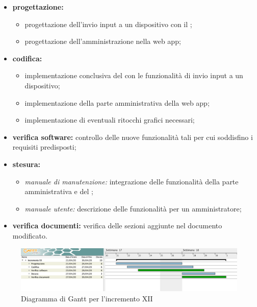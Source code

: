 					\begin{itemize}
						\item \textbf{progettazione:} 
						\begin{itemize}
							\item progettazione dell'invio input a un dispositivo con il ;
							\item progettazione dell'amministrazione nella web app;
						\end{itemize}
						\item \textbf{codifica:} 
						\begin{itemize}
							\item implementazione conclusiva del  con le funzionalità di invio input a un dispositivo; 
							\item implementazione della parte amministrativa della web app;
							\item implementazione di eventuali ritocchi grafici necessari;
						\end{itemize}
						\item \textbf{verifica software:} controllo delle nuove funzionalità tali per cui soddisfino i requisiti predisposti;
						\item \textbf{stesura:} 
						\begin{itemize}
							\item \textit{manuale di manutenzione:} integrazione delle funzionalità della parte amministrativa e del ;
							\item \textit{manuale utente:} descrizione delle funzionalità per un amministratore;
						\end{itemize}
						\item \textbf{verifica documenti:} verifica delle sezioni aggiunte nel documento modificato.
					\end{itemize} 			

		\begin{landscape}
          \begin{figure}[H]
            \centering
            \includegraphics[width=\linewidth]{images/gantt/incrementoXII} %
            \caption{Diagramma di Gantt per l'incremento XII}
          \end{figure}		
		\end{landscape}


